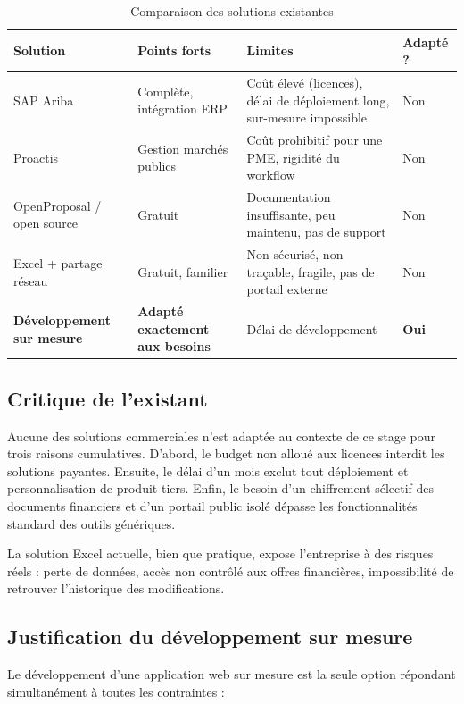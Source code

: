 \begin{table}[ht]
\centering
\caption{Comparaison des solutions existantes}
\label{tab:existant}
\begin{tabularx}{\textwidth}{|l|X|X|X|}
\hline
\textbf{Solution} & \textbf{Points forts} & \textbf{Limites} & \textbf{Adapté ?} \\
\hline
SAP Ariba & Complète, intégration ERP & Coût élevé (licences), délai de déploiement long, sur-mesure impossible & Non \\
\hline
Proactis & Gestion marchés publics & Coût prohibitif pour une PME, rigidité du workflow & Non \\
\hline
OpenProposal / open source & Gratuit & Documentation insuffisante, peu maintenu, pas de support & Non \\
\hline
Excel + partage réseau & Gratuit, familier & Non sécurisé, non traçable, fragile, pas de portail externe & Non \\
\hline
\textbf{Développement sur mesure} & \textbf{Adapté exactement aux besoins} & Délai de développement & \textbf{Oui} \\
\hline
\end{tabularx}
\end{table}

\subsection{Critique de l'existant}

Aucune des solutions commerciales n'est adaptée au contexte de ce stage pour trois raisons cumulatives. D'abord, le budget non alloué aux licences interdit les solutions payantes. Ensuite, le délai d'un mois exclut tout déploiement et personnalisation de produit tiers. Enfin, le besoin d'un chiffrement sélectif des documents financiers et d'un portail public isolé dépasse les fonctionnalités standard des outils génériques.

La solution Excel actuelle, bien que pratique, expose l'entreprise à des risques réels : perte de données, accès non contrôlé aux offres financières, impossibilité de retrouver l'historique des modifications.

\subsection{Justification du développement sur mesure}

Le développement d'une application web sur mesure est la seule option répondant simultanément à toutes les contraintes :

